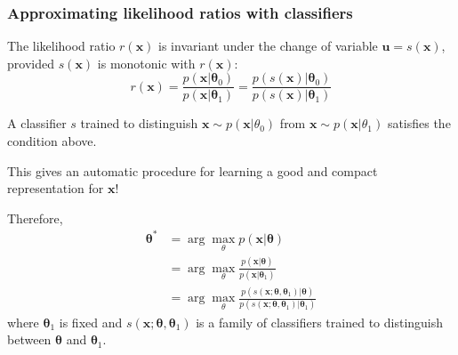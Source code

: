 \documentclass{beamer}
\newcommand{\bftheta}{{\bm \theta}}
\newcommand{\bfx}{\mathbf{x}}
\begin{document}
\begin{frame}
    \frametitle{Approximating likelihood ratios with classifiers}

The likelihood ratio $r(\bfx)$ is invariant under the change of variable $\bm u = s(\bfx)$, provided $s(\bfx)$ is monotonic with $r(\bfx)$:
$$r(\bfx) = \frac{p(\bfx|\bftheta_0)}{p(\bfx|\bftheta_1)} = \frac{p(s(\bfx)|\bftheta_0)}{p(s(\bfx)|\bftheta_1)} $$

A classifier $s$ trained to distinguish $\bfx \sim p(\bfx|\theta_0)$ from $\bfx \sim p(\bfx|\theta_1)$ satisfies the condition above.

\vspace{0.5cm}

This gives an automatic procedure for learning a good and compact representation for $\bfx$!

\end{frame}

\begin{frame}

Therefore,
\begin{align*}
    \bftheta^* &= \arg \max_\theta p(\bfx | \bftheta) \\
               &= \arg \max_\theta \frac{p(\bfx | \bftheta)}{p(\bfx | \bftheta_1)} \\
               &= \arg \max_\theta \frac{p(s(\bfx;\bftheta,\bftheta_1) | \bftheta)}{p(s(\bfx;\bftheta,\bftheta_1) | \bftheta_1)}
\end{align*}
where $\bftheta_1$ is fixed and $s(\mathbf{x};\bftheta,\bftheta_1)$ is a family of classifiers trained to distinguish between $\bftheta$ and $\bftheta_1$.

\end{frame}
\end{document}
